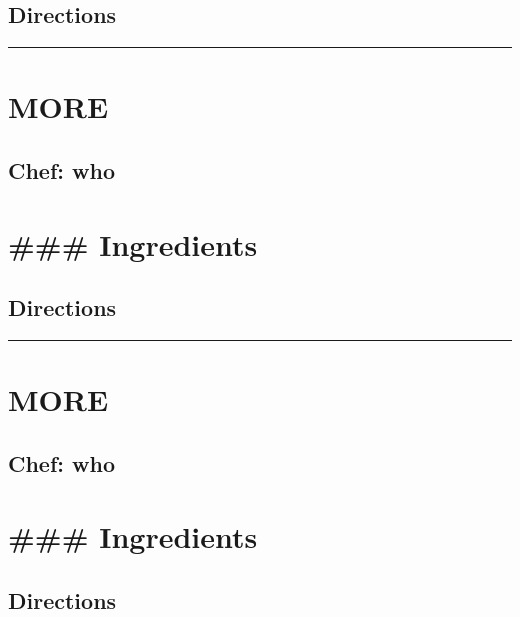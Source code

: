 \documentclass[
]{book}
\begin{document}
\hypertarget{directions-109}{%
\subsection*{Directions}\label{directions-109}}


\begin{center}\rule{0.5\linewidth}{0.5pt}\end{center}

\hypertarget{more-7}{%
\section*{MORE}\label{more-7}}


\hypertarget{chef-who-7}{%
\subsection*{Chef: who}\label{chef-who-7}}


\hypertarget{ingredients-110}{%
\section*{\#\#\# Ingredients}\label{ingredients-110}}


\hypertarget{directions-110}{%
\subsection*{Directions}\label{directions-110}}


\begin{center}\rule{0.5\linewidth}{0.5pt}\end{center}

\hypertarget{more-8}{%
\section*{MORE}\label{more-8}}


\hypertarget{chef-who-8}{%
\subsection*{Chef: who}\label{chef-who-8}}


\hypertarget{ingredients-111}{%
\section*{\#\#\# Ingredients}\label{ingredients-111}}


\hypertarget{directions-111}{%
\subsection*{Directions}\label{directions-111}}
\end{document}
